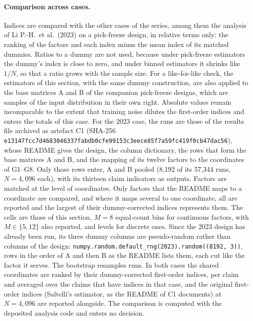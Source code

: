 \documentclass[11pt,a4paper]{article}
\newcommand{\prop}[1]{#1}
\newcommand{\prop}[1]{\textcolor{blue}{#1}}
\begin{document}
\paragraph{Comparison across cases.} Indices are compared with the
other cases of the series, among them the analysis of Li P.-H.\ et al.\
(2023) \prop{on a pick-freeze design}, in relative terms only: the ranking of the
factors and each index minus the mean index of its matched dummies. Ratios
to a dummy are not used, because under \prop{pick-freeze} estimators the dummy's
index is close to zero, and under binned estimators it shrinks like $1/N$,
so that a ratio grows with the sample size. For a like-for-like check, the
estimators of this section, with the same dummy construction, are also
applied to the base matrices A and B of the companion pick-freeze designs,
which are samples of the input distribution in their own right. Absolute
values remain incomparable to the extent that training noise dilutes the
first-order indices and enters the totals of this case. For the
2023 case, the runs are those of the results file archived as artefact C1
(SHA-256 \texttt{e13147fcc7d4683046337fabdb0cfe99\allowbreak 153c3eece85f7a59fc419f0cb47dac56}), whose README gives the
design, the column dictionary, the rows that form the base matrices A and
B, and the mapping of its twelve factors to the coordinates of G1--G8.
Only those rows enter, A and B pooled (8{,}192 of its 57{,}344 runs,
$N=4{,}096$ each), with its thirteen claim indicators as outputs. Factors
are matched at the level of coordinates. Only factors that the README maps
to a coordinate are compared, and where it maps several to one coordinate,
all are reported and the largest of their dummy-corrected indices
represents them. The cells are those of this section, $M=8$ equal-count
bins for continuous factors, with $M\in\{5,12\}$ also reported, and levels
for discrete ones. Since the 2023 design has already been run, its three
dummy columns are pseudo-random rather than columns of the design:
\texttt{numpy.random.default\_rng(2023).random((8192, 3))}, rows in the
order of A and then B as the README lists them, each cut like the factor
it serves. The bootstrap resamples runs. In both cases the shared
coordinates are ranked by their dummy-corrected first-order indices, per
claim and averaged over the claims that have indices in that case, and
the original \prop{first-order indices (Saltelli's estimator, as the
README of C1 documents)} at $N=4{,}096$ are reported alongside. The
comparison is computed with the deposited analysis code and enters no
decision.
\end{document}
